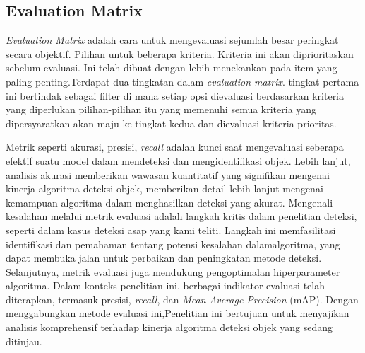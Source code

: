 \subsection{Evaluation Matrix}
\emph{Evaluation Matrix} adalah cara untuk mengevaluasi sejumlah besar peringkat secara objektif. Pilihan untuk beberapa kriteria. Kriteria ini akan diprioritaskan sebelum evaluasi. Ini telah dibuat dengan lebih menekankan pada item yang paling penting.Terdapat dua tingkatan dalam \emph{evaluation matrix}. tingkat pertama ini bertindak sebagai filter di mana setiap opsi dievaluasi berdasarkan kriteria yang diperlukan pilihan-pilihan itu
yang memenuhi semua kriteria yang dipersyaratkan akan maju ke tingkat kedua dan dievaluasi kriteria prioritas. 

Metrik seperti akurasi, presisi, \emph{recall} adalah kunci saat mengevaluasi seberapa efektif suatu model dalam mendeteksi dan mengidentifikasi objek. 
Lebih lanjut, analisis akurasi memberikan wawasan kuantitatif yang signifikan mengenai
kinerja algoritma deteksi objek, memberikan detail lebih lanjut mengenai kemampuan algoritma dalam menghasilkan deteksi yang akurat. Mengenali kesalahan melalui metrik evaluasi
adalah langkah kritis dalam penelitian deteksi, seperti dalam kasus deteksi asap yang kami
teliti. Langkah ini memfasilitasi identifikasi dan pemahaman tentang potensi kesalahan dalamalgoritma, yang dapat membuka jalan untuk perbaikan dan peningkatan metode deteksi. Selanjutnya, metrik evaluasi juga mendukung pengoptimalan hiperparameter algoritma.
Dalam konteks penelitian ini, berbagai indikator evaluasi telah diterapkan, termasuk presisi, \emph{recall}, dan\emph{ Mean Average Precision} (mAP). Dengan menggabungkan metode evaluasi ini,Penelitian ini bertujuan untuk menyajikan analisis komprehensif terhadap kinerja algoritma deteksi objek yang sedang ditinjau.

